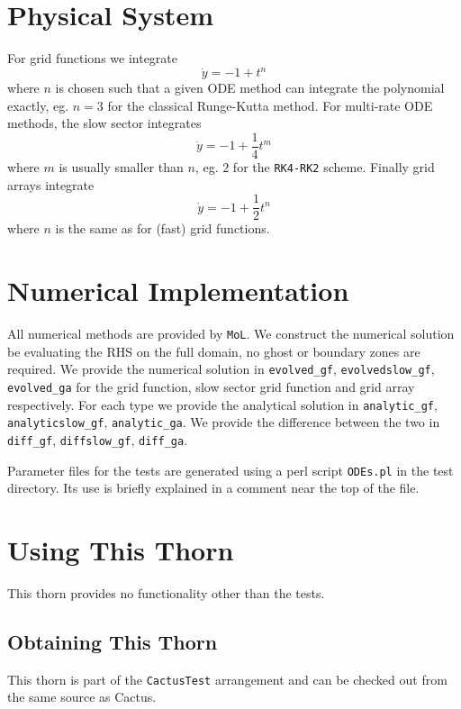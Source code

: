 \section{Physical System}
For grid functions we integrate
\begin{equation}
\dot y = -1 + t^n
\end{equation}
where $n$ is chosen such that a given ODE method can integrate the polynomial
exactly, eg. $n=3$ for the classical Runge-Kutta method. For multi-rate ODE
methods, the slow sector integrates
\begin{equation}
\dot y = -1 + \frac14 t^m
\end{equation}
where $m$ is usually smaller than $n$, eg. $2$ for the \texttt{RK4-RK2} scheme.
Finally grid arrays integrate
\begin{equation}
\dot y = -1 + \frac12 t^n
\end{equation}
where $n$ is the same as for (fast) grid functions.

\section{Numerical Implementation}
All numerical methods are provided by \texttt{MoL}. We construct the
numerical solution be evaluating the RHS on the full domain, no ghost or
boundary zones are required. We provide the numerical solution in
\texttt{evolved\_gf}, \texttt{evolvedslow\_gf}, \texttt{evolved\_ga} for the
grid function, slow sector grid function and grid array respectively. For each
type we provide the analytical solution in \texttt{analytic\_gf},
\texttt{analyticslow\_gf}, \texttt{analytic\_ga}. We provide the difference
between the two in \texttt{diff\_gf}, \texttt{diffslow\_gf},
\texttt{diff\_ga}.

Parameter files for the tests are generated using a perl script
\texttt{ODEs.pl} in the test directory. Its use is briefly explained in a
comment near the top of the file.

\section{Using This Thorn}
This thorn provides no functionality other than the tests.

\subsection{Obtaining This Thorn}
This thorn is part of the \texttt{CactusTest} arrangement and can be checked
out from the same source as Cactus.

